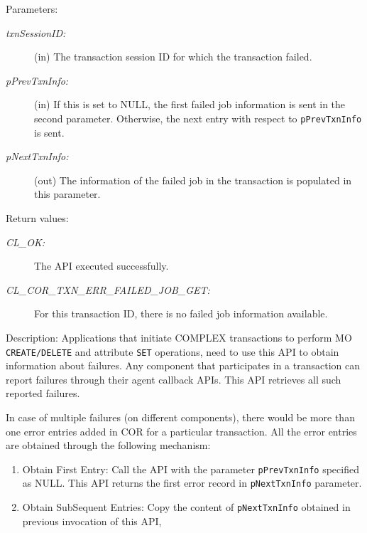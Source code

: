 \begin{flushleft}
\begin{Desc}
\begin{verbatim}
\end{verbatim}
\normalsize
\end{Desc}
\begin{Desc}
\item[Parameters:]
\begin{description}
\item[{\em txn\-Session\-ID:}](in) The transaction session ID for which the transaction failed.
\item[{\em p\-Prev\-Txn\-Info:}](in) If this is set to NULL, the first failed job information is sent in the second parameter. Otherwise, the next entry
with respect to {\tt{pPrevTxnInfo}} is sent.
\item[{\em p\-Next\-Txn\-Info:}](out) The information of the failed job in the transaction is populated in this parameter.\end{description}
\end{Desc}
\begin{Desc}
\item[Return values:]
\begin{description}
\item[{\em CL\_\-OK:}]The API executed successfully. 
\item[{\em CL\_\-COR\_\-TXN\_\-ERR\_\-FAILED\_\-JOB\_\-GET:}]For this transaction ID, there is no failed job information available.
\end{description}
\end{Desc}
\begin{Desc}
\item[Description:] Applications that initiate COMPLEX transactions to perform MO {\tt{CREATE/DELETE}} and attribute {\tt{SET}} operations, need
 to use this API to obtain information about failures. Any component that participates in a transaction can
 report failures through their agent callback APIs. This API retrieves all such reported failures.
 \par
 In case of multiple failures (on different components), there would be more than one error
 entries added in COR for a particular transaction. All the error entries are obtained through the
 following mechanism: 
 \begin{enumerate}
 \item
 Obtain First Entry: Call the API with the parameter {\tt{pPrevTxnInfo}} specified as NULL. This API
     returns the first error record in {\tt{pNextTxnInfo}} parameter.
 \item
 Obtain SubSequent Entries: Copy the  content of {\tt{pNextTxnInfo}} obtained in previous invocation of this API, 

\end{enumerate}
\end{Desc}
\end{flushleft}
